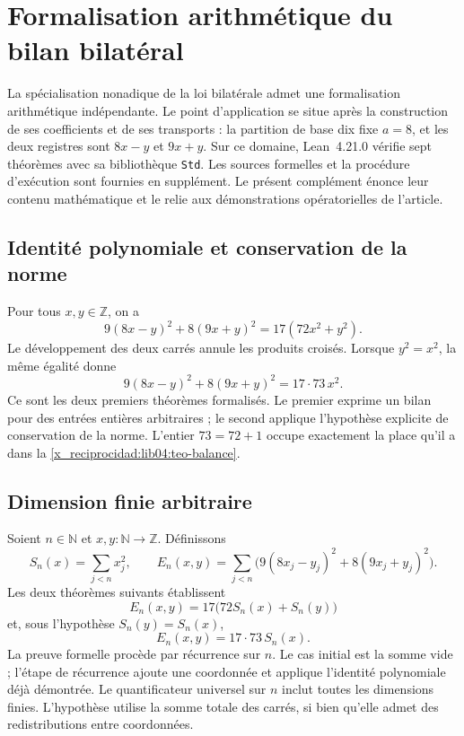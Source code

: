 \chapter*{Formalisation arithmétique du bilan bilatéral}
\label{x_reciprocidad:libro:formalizacion-lean}

La spécialisation nonadique de la loi bilatérale admet une formalisation
arithmétique indépendante. Le point d’application se situe après la
construction de ses coefficients et de ses transports : la partition de base dix fixe
\(a=8\), et les deux registres sont \(8x-y\) et \(9x+y\). Sur ce domaine,
Lean~4.21.0 vérifie sept théorèmes avec sa bibliothèque \texttt{Std}. Les sources
formelles et la procédure d’exécution sont fournies en supplément.
Le présent complément énonce leur contenu mathématique et le relie aux
démonstrations opératorielles de l’article.

\section*{Identité polynomiale et conservation de la norme}

Pour tous \(x,y\in\mathbb Z\), on a
\[
 9(8x-y)^2+8(9x+y)^2=17(72x^2+y^2).
\]
Le développement des deux carrés annule les produits croisés. Lorsque \(y^2=x^2\), la même égalité donne
\[
 9(8x-y)^2+8(9x+y)^2=17\cdot73\,x^2.
\]
Ce sont les deux premiers théorèmes formalisés. Le premier exprime un
bilan pour des entrées entières arbitraires ; le second applique l’hypothèse
explicite de conservation de la norme. L’entier \(73=72+1\) occupe
exactement la place qu’il a dans la \cref{x_reciprocidad:lib04:teo-balance}.

\section*{Dimension finie arbitraire}

Soient \(n\in\mathbb N\) et \(x,y:\mathbb N\to\mathbb Z\). Définissons
\[
 S_n(x)=\sum_{j<n}x_j^2,
 \qquad
 E_n(x,y)=\sum_{j<n}\bigl(9(8x_j-y_j)^2+8(9x_j+y_j)^2\bigr).
\]
Les deux théorèmes suivants établissent
\[
 E_n(x,y)=17\bigl(72S_n(x)+S_n(y)\bigr)
\]
et, sous l'hypothèse \(S_n(y)=S_n(x)\),
\[
 E_n(x,y)=17\cdot73\,S_n(x).
\]
La preuve formelle procède par récurrence sur \(n\). Le cas initial est la somme vide ; l'étape de récurrence ajoute une coordonnée et applique l'identité polynomiale déjà démontrée. Le quantificateur universel sur \(n\) inclut toutes les dimensions finies. L'hypothèse utilise la somme totale des carrés, si bien qu'elle admet des redistributions entre coordonnées.

